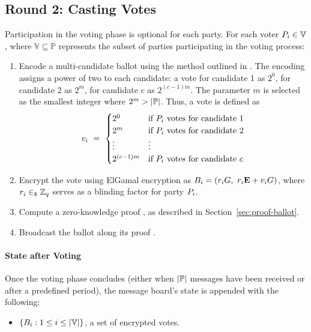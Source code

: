 \documentclass[runningheads]{llncs}
\begin{document}
\subsection{Round 2: Casting Votes}

Participation in the voting phase is optional for each party. For each voter $P_{i} \in \mathbb{V}$, where $\mathbb{V} \subseteq  \mathbb{P}$ represents the subset of parties participating in the voting process:

\begin{enumerate}
    \item Encode a multi-candidate ballot using the method outlined in \cite{baudronPracticalMulticandidateElection2001}. The encoding assigns a power of two to each candidate: a vote for candidate 1 as $2^0$, for candidate 2 as $2^m$, for candidate $c$ as $2^{(c-1)m}$. The parameter $m$ is selected as the smallest integer where $2^m > |\mathbb{P}{}|$. Thus, a vote is defined as \[v_{i}\ =\ \begin{cases} 2^0 & \text{if } P_{i} \text{ votes for candidate 1} \\ 2^m & \text{if } P_{i} \text{ votes for candidate 2} \\ \vdots & \vdots \\ 2^{(c-1)m} & \text{if } P_{i} \text{ votes for candidate $c$}\end{cases}\]
    
    \item Encrypt the vote using ElGamal encryption as $\Ballot{i} = (\BlindingFactor{i} \G,\ \BlindingFactor{i} \EncryptionKey{} + \Vote{i} \G)$, where $r_{i} \in_{\$} \mathbb{Z}_q$ serves as a blinding factor for party $P_{i}$.
    
    \item Compute a zero-knowledge proof , as described in Section~\ref{sec:proof-ballot}.
    
    \item Broadcast the ballot  along its proof .
\end{enumerate}

\paragraph{State after Voting}

Once the voting phase concludes (either when $|\mathbb{P}|$ messages have been received or after a predefined period), the message board's state is appended with the following:
\begin{itemize}
    \item $\{B_{i} : 1 \leq i \leq |\mathbb{V}|\}$, a set of encrypted votes.
\end{itemize}
\end{document}
